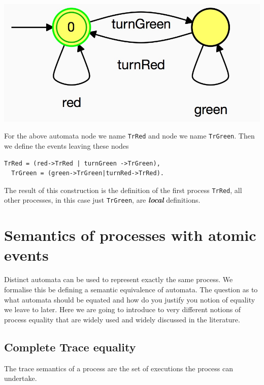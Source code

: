\documentclass[]{article}
\begin{document}
\noindent\begin{center} \includegraphics[scale=0.15]{TrRed.jpg} \end{center}

For the above automata node {} we name \verb$TrRed$ and  node {} we name \verb$TrGreen$. Then we define the events leaving these nodes
\begin{center}\begin{minipage}{0.5\textwidth}
\begin{verbatim}
TrRed = (red->TrRed | turnGreen ->TrGreen),
  TrGreen = (green->TrGreen|turnRed->TrRed).
\end{verbatim}
\end{minipage}\end{center}

  The result of this construction is the definition of the first process \verb$TrRed$, all other processes, in this case just  \verb$TrGreen$, are  {\bf \it local} definitions.

\section{Semantics of processes with atomic events}
 Distinct automata can be used to  represent exactly the same process. We formalise this be defining a semantic equivalence  of automata.  The question as to what automata should be equated and how do you justify you notion of equality we leave to later. Here we are going to introduce to very different notions of process equality that are widely used and widely discussed in the literature.




 \subsection{Complete Trace equality}\label{sec:Trc}
 The trace semantics of a process are the set of executions the process can undertake.
\end{document}

